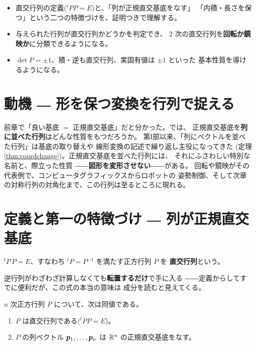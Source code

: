 \begin{goal}
\begin{itemize}
\item 直交行列の定義(${}^t\!P P = E$)と、「列が正規直交基底をなす」
「内積・長さを保つ」という二つの特徴づけを、証明つきで理解する。
\item 与えられた行列が直交行列かどうかを判定でき、
$2$ 次の直交行列を\textbf{回転か鏡映か}に分類できるようになる。
\item $\det P = \pm 1$、積・逆も直交行列、実固有値は $\pm 1$ といった
基本性質を導けるようになる。
\end{itemize}
\end{goal}

\section{動機 ― 形を保つ変換を行列で捉える}

前章で「良い基底 $=$ 正規直交基底」だと分かった。では、
正規直交基底を\textbf{列に並べた行列}はどんな性質をもつだろうか。
第I部以来、「列にベクトルを並べた行列」は基底の取り替えや
線形変換の記述で繰り返し主役になってきた
(定理 \ref{thm:coordchange})。正規直交基底を並べた行列には、
それにふさわしい特別な名前と、際立った性質
――\textbf{図形を変形させない}――がある。
回転や鏡映がその代表例で、コンピュータグラフィックスからロボットの
姿勢制御、そして次章の対称行列の対角化まで、この行列は至るところに現れる。

\section{定義と第一の特徴づけ ― 列が正規直交基底}

\begin{teigi}[直交行列]\label{def:orth}
${}^t\!P\,P = E$、すなわち ${}^t\!P = P^{-1}$ を満たす正方行列 $P$ を
\textbf{直交行列}という。
\end{teigi}

逆行列がわざわざ計算しなくても\textbf{転置するだけ}で手に入る
――定義からしてすでに便利だが、この式の本当の意味は
成分を読むと見えてくる。

\begin{teiri}[直交行列 $=$ 正規直交基底を列に並べた行列]\label{thm:orth-column}
$n$ 次正方行列 $P$ について、次は同値である。
\begin{enumerate}
\item $P$ は直交行列である(${}^t\!P P = E$)。
\item $P$ の列ベクトル $\bm{p}_1, \dots, \bm{p}_n$ は
$\mathbb{R}^n$ の正規直交基底をなす。
\end{enumerate}
\end{teiri}

